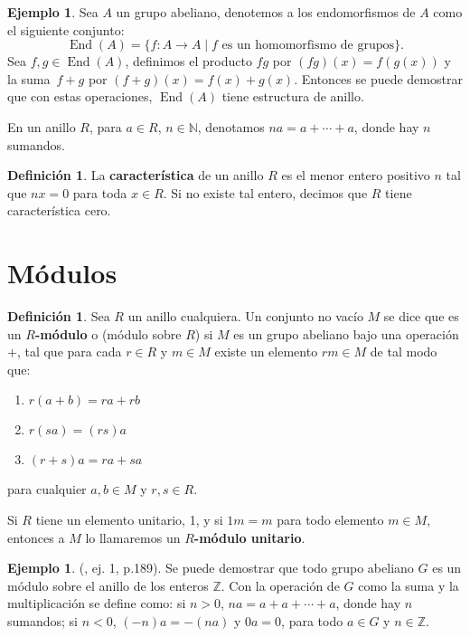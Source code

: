 \documentclass[12pt]{book}
\theoremstyle{definition}
\newtheorem{definition}[theorem]{Definición}
\newtheorem{example}[theorem]{Ejemplo}
\DeclareMathOperator{\End}{End}
\newcounter{in}
\newcounter{ini}
\begin{document}
\begin{example}
  Sea $A$ un grupo abeliano, denotemos a los endomorfismos de $A$ como
  el siguiente conjunto: 
  \begin{equation*}
    \End(A)=\{f:A\rightarrow A\mid f\mbox{ es un homomorfismo de grupos}\}.
    \label{endomorfismos}
  \end{equation*}
  Sea $f,g\in\End(A)$, definimos el producto $fg$ por $(fg)(x)=f(g(x))$ y
  la suma~$f+g$ por $(f+g)(x)=f(x)+g(x)$. Entonces se puede demostrar
  que con estas operaciones, $\End(A)$ tiene estructura de anillo.
\end{example}

En un anillo $R$, para $a\in R$, $n\in\mathbb{N}$, denotamos $na=a+\cdots+a$, donde hay $n$ sumandos.
\begin{definition}
  La \textbf{característica} de un anillo $R$ es el menor entero positivo $n$
  tal que $nx=0$ para toda $x\in R$. Si no existe tal entero, decimos
  que $R$ tiene característica cero.
\end{definition}

\section{Módulos}
\label{modulos}

\begin{definition}
  Sea $R$ un anillo cualquiera. Un conjunto no vacío $M$ se dice que
  es un \textbf{$R$-módulo} o (módulo sobre $R$) si $M$ es un grupo abeliano
  bajo una operación $+$, tal que para cada $r\in R$ y $m\in M$ existe
  un elemento $rm\in M$ de tal modo que:
  \begin{enumerate}
  \item $r(a+b)=ra+rb$
  \item $r(sa)=(rs)a$
  \item $(r+s)a=ra+sa$
  \end{enumerate}
  para cualquier $a,b \in M$ y $r,s\in R$.

  Si $R$ tiene un elemento unitario, 1, y si $1m=m$ para todo elemento
  $m\in M$, entonces a $M$ lo llamaremos un \textbf{$R$-módulo
  unitario}.
\end{definition}

\begin{example}{\normalfont (\cite{herstein1990algebra}, ej. 1, p.189).}
  Se puede demostrar que todo grupo abeliano $G$ es un módulo sobre el anillo de los enteros
  $\mathbb{Z}$. Con la operación de $G$ como la suma y la
  multiplicación se define como: si $n>0$, $na=a+a+\cdots+a$, donde
  hay $n$ sumandos; si  $n<0$, $(-n)a=-(na)$ y $0a=0$, para todo $a\in G$ y $n\in \mathbb{Z}$.
\end{example}
\end{document}
